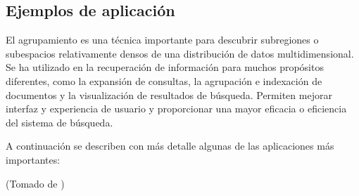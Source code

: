 \documentclass{llncs}
\begin{document}
\subsection{Ejemplos de aplicaci\'on} 
El agrupamiento es una técnica importante para descubrir subregiones o subespacios relativamente densos de una distribución de datos multidimensional. Se ha utilizado en la recuperación de información para muchos propósitos diferentes, como la expansión de consultas, la agrupación e indexación de documentos y la visualización de resultados de búsqueda. Permiten mejorar interfaz y experiencia de usuario y proporcionar una mayor eficacia o eficiencia del sistema de búsqueda. 

A continuaci\'on se describen con m\'as detalle algunas de las aplicaciones m\'as importantes:
\begin{flushright}
	\scriptsize*(Tomado de \cite{B1})
	\normalsize
\end{flushright} 
\end{document}
